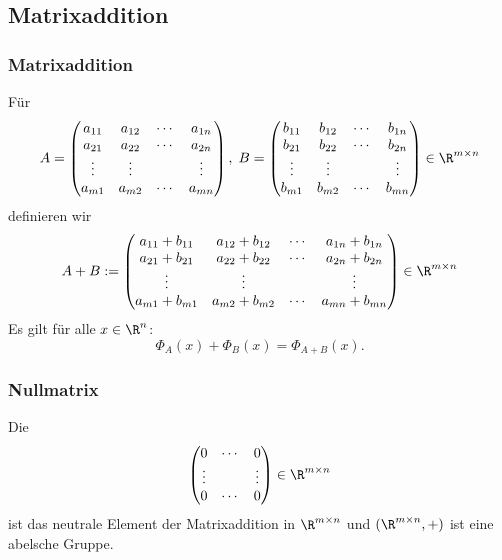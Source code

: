 \subsection{Matrixaddition}
\makeSectionDividerPage
%
\begin{frame}\frametitle{Matrixaddition}

	Für 
	$$
		A = 
			\begin{pmatrix}
				a_{11}	&a_{12}	&\cdots	&a_{1n}\\
				a_{21} 	&a_{22} 	&\cdots 	&a_{2n}\\
				\vdots 	&\vdots   	&            	&\vdots \\
				a_{m1} 	&a_{m2} 	&\cdots 	&a_{mn}
			\end{pmatrix},
		\;
		B = 
			\begin{pmatrix}
				b_{11}	&b_{12}	&\cdots	&b_{1n}\\
				b_{21} 	&b_{22} 	&\cdots 	&b_{2n}\\
				\vdots 	&\vdots   	&            	& \vdots \\
				b_{m1} 	&b_{m2} 	&\cdots 	&b_{mn}
			\end{pmatrix}
		\in \R^{m\times n}
	$$
	definieren wir
	$$
		A+B := 
			\begin{pmatrix}
				a_{11} + b_{11}		&a_{12} + b_{12}	&\cdots	&a_{1n} + b_{1n}\\
				a_{21} + b_{21}		&a_{22} + b_{22}	&\cdots	& a_{2n} + b_{2n}\\
				\vdots 			&\vdots   			&            	& \vdots \\
				a_{m1} + b_{m1}	&a_{m2} + b_{m2}	&\cdots	& a_{mn} + b_{mn}
			\end{pmatrix} \in \R^{m \times n}
	$$
	\pause
	Es gilt für alle $x\in \R^n$:
	$$
		\Phi_A(x) + \Phi_B(x) = \Phi_{A+B}(x). 
	$$
	
\end{frame}
%
%
\begin{frame}\frametitle{Nullmatrix}

	Die 
	$$
		\begin{pmatrix}
			0		&\cdots	&0		\\
			\vdots	&		&\vdots	\\
			0		&\cdots	&0
		\end{pmatrix}
		\in \R^{m\times n}
	$$
	ist das neutrale Element der Matrixaddition  in $\R^{m\times n}$ und	
	$(\R^{m\times n}, +)$ ist eine abelsche Gruppe.

\end{frame}
%
